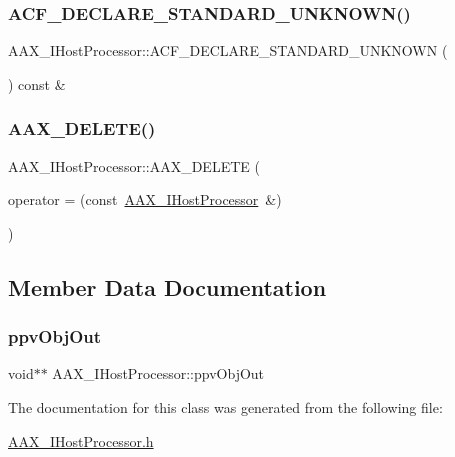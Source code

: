 \subsubsection{\texorpdfstring{ACF\_DECLARE\_STANDARD\_UNKNOWN()}{ACF\_DECLARE\_STANDARD\_UNKNOWN()}}
{\footnotesize\ttfamily A\+A\+X\+\_\+\+I\+Host\+Processor\+::\+A\+C\+F\+\_\+\+D\+E\+C\+L\+A\+R\+E\+\_\+\+S\+T\+A\+N\+D\+A\+R\+D\+\_\+\+U\+N\+K\+N\+O\+WN (\begin{DoxyParamCaption}{ }\end{DoxyParamCaption}) const \&}

\mbox{\label{a01833_a49bf62b79b57465c39238b54fc836753}} 
\subsubsection{\texorpdfstring{AAX\_DELETE()}{AAX\_DELETE()}}
{\footnotesize\ttfamily A\+A\+X\+\_\+\+I\+Host\+Processor\+::\+A\+A\+X\+\_\+\+D\+E\+L\+E\+TE (\begin{DoxyParamCaption}\item[{\mbox{\hyperlink{a01833}{A\+A\+X\+\_\+\+I\+Host\+Processor}} \&}]{operator = {\ttfamily (const~\mbox{\hyperlink{a01833}{A\+A\+X\+\_\+\+I\+Host\+Processor}}~\&)} }\end{DoxyParamCaption})}



\subsection{Member Data Documentation}
\mbox{\label{a01833_a780e10c6159c1af2e1a62f990131ca78}} 
\subsubsection{\texorpdfstring{ppvObjOut}{ppvObjOut}}
{\footnotesize\ttfamily void$\ast$$\ast$ A\+A\+X\+\_\+\+I\+Host\+Processor\+::ppv\+Obj\+Out}



The documentation for this class was generated from the following file\+:\begin{DoxyCompactItemize}
\item 
\mbox{\hyperlink{a00605}{A\+A\+X\+\_\+\+I\+Host\+Processor.\+h}}\end{DoxyCompactItemize}
